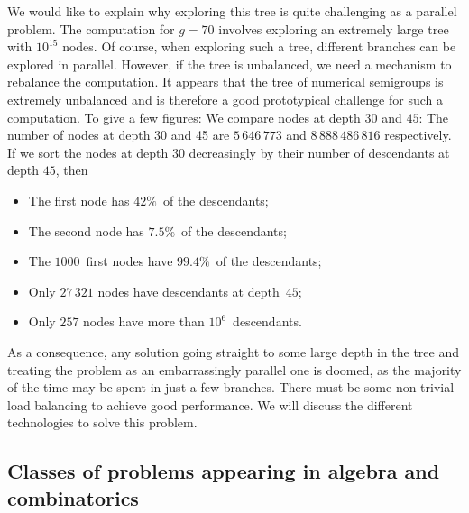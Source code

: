 \documentclass{deliverablereport}
\begin{document}
We would like to explain why exploring this tree is quite challenging as a
parallel problem. The computation for $g=70$ involves exploring an extremely
large tree with $10^{15}$ nodes. Of course, when exploring such a tree,
different branches can be explored in parallel. However, if the tree is
unbalanced, we need a mechanism to rebalance the computation. It appears that
the tree of numerical semigroups is extremely unbalanced and is therefore a good
prototypical challenge for such a computation. To give a few figures: We
compare nodes at depth $30$ and $45$: The number of nodes at depth 30 and 45
are $5\,646\,773$ and $8\,888\,486\,816$ respectively. If we sort the nodes
at depth $30$ decreasingly by their number of descendants at depth $45$, then
\begin{itemize}
\item The first node has $42\%$~of the descendants;
\item The second node has $7.5\%$~of the descendants;
\item The $1000$~first nodes have $99.4\%$~of the descendants;
\item Only $27\,321$ nodes have descendants at depth~$45$;
\item Only $257$ nodes have more than $10^6$~descendants.
\end{itemize}
As a consequence, any solution going straight to some large depth in the tree and
treating the problem as an embarrassingly parallel one is doomed, as the majority
of the time may be spent in just a few branches. There must be
some non-trivial load balancing to achieve good performance.  We will discuss the
different technologies to solve this problem.

 
\subsection{Classes of problems appearing in algebra and combinatorics}
\end{document}
